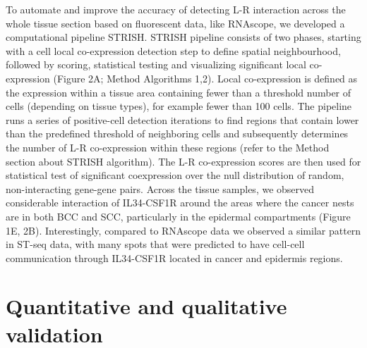 To automate and improve the accuracy of detecting L-R interaction across the whole tissue section based on fluorescent data, like RNAscope, we developed a computational pipeline STRISH. STRISH pipeline consists of two phases, starting with a cell local co-expression detection step to define spatial neighbourhood, followed by scoring, statistical testing and visualizing significant local co-expression (Figure 2A; Method Algorithms 1,2). Local co-expression is defined as the expression within a tissue area containing fewer than a threshold number of cells (depending on tissue types), for example fewer than 100 cells. The pipeline runs a series of positive-cell detection iterations to find regions that contain lower than the predefined threshold of neighboring cells and subsequently determines the number of L-R co-expression within these regions (refer to the Method section about STRISH algorithm). The L-R co-expression scores are then used for statistical test of significant coexpression over the null distribution of random, non-interacting gene-gene pairs. Across the tissue samples, we observed considerable interaction of IL34-CSF1R around the areas where the cancer nests are in both BCC and SCC, particularly in the epidermal compartments (Figure 1E, 2B). Interestingly, compared to RNAscope data we observed a similar pattern in ST-seq data, with many spots that were predicted to have cell-cell communication through IL34-CSF1R located in cancer and epidermis regions.  

\section{Quantitative and qualitative validation}
\label{Sec:2.3_validation}	%
